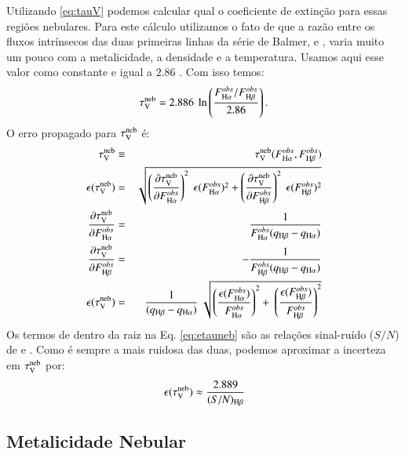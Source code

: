 Utilizando \eqref{eq:tauV} podemos calcular qual o coeficiente de extinção para essas regiões
nebulares. Para este cálculo utilizamos o fato de que a razão entre os fluxos intrínsecos das duas
primeiras linhas da série de Balmer, \Halpha e \Hbeta, varia muito um pouco com a metalicidade, a
densidade e a temperatura. Usamos aqui esse valor como constante e igual a $2.86$
\citep{Osterbrock.Ferland.2006a}. Com isso temos:
\begin{equation}
	\tauVN = 2.886\ \ln \left( \frac{F_{\Halpha}^{obs}/F_{\Hbeta}^{obs}}{2.86} \right).
\end{equation}
O erro propagado para $\tau_{\mathrm{V}}^{\mathrm{neb}}$ é:
\begin{eqnarray}
	\tauVN &\equiv& \tauVN(F_{\Halpha}^{obs}, F_{\Hbeta}^{obs}) \\
	\epsilon (\tauVN) &=& \sqrt{\left(\del{\tauVN}{F_{\Halpha}^{obs}}\right)^2 \
\epsilon (F_{\Halpha}^{obs})^2 + \left(\del{\tauVN}{F_{\Hbeta}^{obs}}\right)^2 \
\epsilon (F_{\Hbeta}^{obs})^2 } \\
	\del{\tauVN}{F_{\Halpha}^{obs}} &=& \frac{1}{F_{\Halpha}^{obs} (q_{\Hbeta} - q_{\Halpha})} \\
	\del{\tauVN}{F_{\Hbeta}^{obs}} &=& - \frac{1}{F_{\Hbeta}^{obs} (q_{\Hbeta} - q_{\Halpha})} \\
	\epsilon (\tauVN) &=& \frac{1}{(q_{\Hbeta} - q_{\Halpha})} \
\sqrt{\left(\frac{\epsilon (F_{\Halpha}^{obs})}{F_{\Halpha}^{obs}}\right)^2 + \
\left(\frac{\epsilon (F_{\Hbeta}^{obs})}{F_{\Hbeta}^{obs}}\right)^2 }
	\label{eq:etauneb}
\end{eqnarray}
\noindent Os termos de dentro da raiz na Eq. \ref{eq:etauneb} são as relações sinal-ruído ($S/N$) de
\Halpha e \Hbeta. Como \Hbeta é sempre a mais ruidosa das duas, podemos aproximar a incerteza em $\tau_{\mathrm{V}}^{\mathrm{neb}}$
por:
\begin{equation}
	\epsilon (\tauVN) \approx \frac{2.889}{(S/N)_{\Hbeta}}
	\label{eq:etaunebaprox}
\end{equation}

\subsection{Metalicidade Nebular}
\label{sec:emline:datacube:Zneb}

